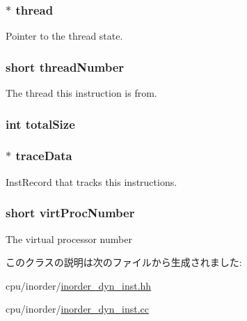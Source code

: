 \label{classInOrderDynInst_a7d7da113347fdefcd5ad59f29769df0b}
\hypertarget{classInOrderDynInst_ac297691c06a1cd4769d8eba7822395b9}{
\subsubsection[{thread}]{$\ast$ {\bf thread}}}
\label{classInOrderDynInst_ac297691c06a1cd4769d8eba7822395b9}
Pointer to the thread state. \hypertarget{classInOrderDynInst_ae714c38dca501686b9cb14dad9a009db}{
\subsubsection[{threadNumber}]{\setlength{\rightskip}{0pt plus 5cm}short {\bf threadNumber}}}
\label{classInOrderDynInst_ae714c38dca501686b9cb14dad9a009db}
The thread this instruction is from. \hypertarget{classInOrderDynInst_a645e08725d4990fa97be7b032784866c}{
\subsubsection[{totalSize}]{\setlength{\rightskip}{0pt plus 5cm}int {\bf totalSize}}}
\label{classInOrderDynInst_a645e08725d4990fa97be7b032784866c}
\hypertarget{classInOrderDynInst_ab6afba48e8363686299580a3df05dd43}{
\subsubsection[{traceData}]{$\ast$ {\bf traceData}}}
\label{classInOrderDynInst_ab6afba48e8363686299580a3df05dd43}
InstRecord that tracks this instructions. \hypertarget{classInOrderDynInst_a1f5f5e69ef26bddaea88b672235dbc59}{
\subsubsection[{virtProcNumber}]{\setlength{\rightskip}{0pt plus 5cm}short {\bf virtProcNumber}}}
\label{classInOrderDynInst_a1f5f5e69ef26bddaea88b672235dbc59}
The virtual processor number 

このクラスの説明は次のファイルから生成されました:\begin{DoxyCompactItemize}
\item 
cpu/inorder/\hyperlink{inorder__dyn__inst_8hh}{inorder\_\-dyn\_\-inst.hh}\item 
cpu/inorder/\hyperlink{inorder__dyn__inst_8cc}{inorder\_\-dyn\_\-inst.cc}\end{DoxyCompactItemize}
